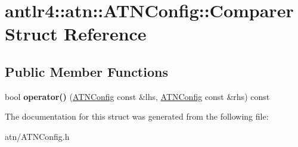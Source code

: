 \hypertarget{structantlr4_1_1atn_1_1ATNConfig_1_1Comparer}{}\section{antlr4\+:\+:atn\+:\+:A\+T\+N\+Config\+:\+:Comparer Struct Reference}
\label{structantlr4_1_1atn_1_1ATNConfig_1_1Comparer}
\subsection*{Public Member Functions}
\begin{DoxyCompactItemize}
\item 
\mbox{\label{structantlr4_1_1atn_1_1ATNConfig_1_1Comparer_a9c1ad13718f8e276422d1a6eaad0a3d2}} 
bool {\bfseries operator()} (\hyperlink{classantlr4_1_1atn_1_1ATNConfig}{A\+T\+N\+Config} const \&lhs, \hyperlink{classantlr4_1_1atn_1_1ATNConfig}{A\+T\+N\+Config} const \&rhs) const
\end{DoxyCompactItemize}


The documentation for this struct was generated from the following file\+:\begin{DoxyCompactItemize}
\item 
atn/A\+T\+N\+Config.\+h\end{DoxyCompactItemize}

